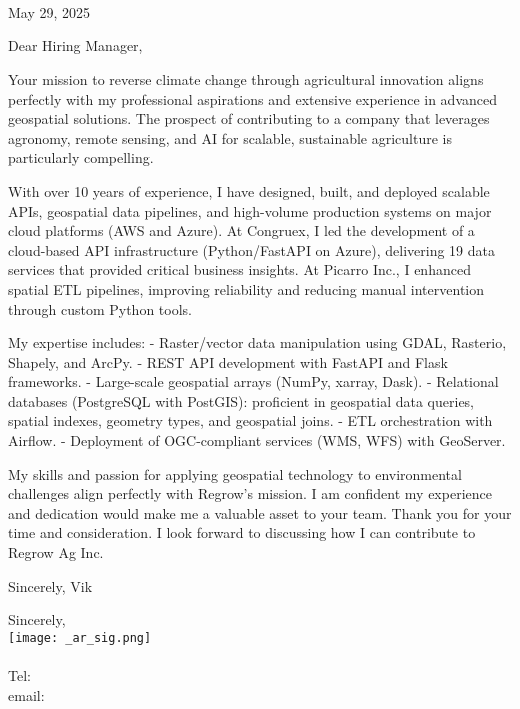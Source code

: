 \documentclass[letterpaper]{article}
\begin{document}
\large
\JobManager \\
\JobManagerTitle \\
\textbf{\JobCompany} \\

\null\hfill May 29, 2025

Dear Hiring Manager,

Your mission to reverse climate change through agricultural innovation aligns
perfectly with my professional aspirations and extensive experience in advanced geospatial solutions. 
The prospect of contributing to a company that leverages agronomy, remote sensing, and AI for scalable, 
sustainable agriculture is particularly compelling.  

With over 10 years of experience, I have designed, built, and deployed scalable
APIs, geospatial data pipelines, and high-volume production systems on major
cloud platforms (AWS and Azure). At Congruex, I led the development of a
cloud-based API infrastructure (Python/FastAPI on Azure), delivering 19 data
services that provided critical business insights. At Picarro Inc., I enhanced
spatial ETL pipelines, improving reliability and reducing manual intervention
through custom Python tools.


My expertise includes:
 - Raster/vector data manipulation using GDAL, Rasterio, Shapely, and ArcPy.
 - REST API development with FastAPI and Flask frameworks.
 - Large-scale geospatial arrays (NumPy, xarray, Dask).
 - Relational databases (PostgreSQL with PostGIS): proficient in geospatial data queries, spatial indexes, geometry types, and geospatial joins.
 - ETL orchestration with Airflow.
 - Deployment of OGC-compliant services (WMS, WFS) with GeoServer.

My skills and passion for applying geospatial technology to environmental challenges align perfectly with Regrow’s mission. 
I am confident my experience and dedication would make me a valuable asset to your team. 
Thank you for your time and consideration.
I look forward to discussing how I can contribute to Regrow Ag Inc.

Sincerely, Vik



Sincerely,\\
    \hspace{1em}
    \texttt{[image: \_ar\_sig.png]} \\
    \CVsigname \\
    \small
    Tel: \CVphone \\
    email: \CVemail
\end{document}
